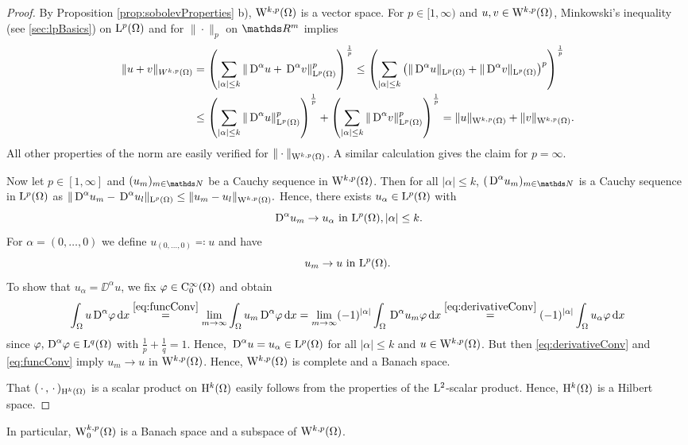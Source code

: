 \begin{proof}
  By Proposition \ref{prop:sobolevProperties} b), $\mathrm{W}^{k,p}(\Omega)$ is a vector space.
  For $p \in [1,\infty)$ and $u,v \in \mathrm{W}^{k,p}(\Omega)$, Minkowski's inequality (see \ref{sec:lpBasics}) on $\mathrm{L}^p(\Omega)$ and for $\|\cdot\|_p$ on $\R^m$ implies
    \begin{align*}
      \|u + v\|_{W^{k,p}(\Omega)}
      &= \left( \sum_{|\alpha| \leq k} \|\,{\operatorname{D}}^\alpha u + \,{\operatorname{D}}^\alpha v\|^p_{\mathrm{L}^p(\Omega)} \right)^{\frac{1}{p}} 
      \leq \left( \sum_{|\alpha|\leq k} \left( \|\,{\operatorname{D}}^\alpha u\|_{\mathrm{L}^p(\Omega)} + \|\,{\operatorname{D}}^\alpha v\|_{\mathrm{L}^p(\Omega)} \right)^p \right)^{\frac{1}{p}} \\
      &\leq \left( \sum_{|\alpha| \leq k} \|\,{\operatorname{D}}^\alpha u\|_{\mathrm{L}^p(\Omega)}^p\right)^{\frac{1}{p}}
      + \left( \sum_{|\alpha| \leq k} \|\,{\operatorname{D}}^\alpha v\|_{\mathrm{L}^p(\Omega)}^p\right)^{\frac{1}{p}}
      = \|u\|_{\mathrm{W}^{k,p}(\Omega)} + \|v\|_{\mathrm{W}^{k,p}(\Omega)}.
    \end{align*}
    All other properties of the norm are easily verified for $\|\cdot\|_{\mathrm{W}^{k,p}(\Omega)}$.
    A similar calculation gives the claim for $p = \infty$.

    Now let $p \in [1,\infty]$ and  $(u_m)_{m \in \N}$ be a Cauchy sequence in $\mathrm{W}^{k,p}(\Omega)$.
    Then for all $|\alpha|\leq k$, $(\DD^\alpha u_m)_{m \in \N}$ is a Cauchy sequence in $\mathrm{L}^p(\Omega)$ as 
    $
    \|\,{\operatorname{D}}^\alpha u_m - \,{\operatorname{D}}^\alpha u_l \|_{\mathrm{L}^p(\Omega)} \leq \|u_m - u_l \|_{\mathrm{W}^{k,p}(\Omega)}.
    $
    Hence, there exists $u_\alpha \in \mathrm{L}^p(\Omega)$ with
    \begin{equation}
      \label{eq:derivativeConv}
      \,{\operatorname{D}}^\alpha u_m \to u_\alpha \text{ in } \mathrm{L}^p(\Omega), |\alpha| \leq k.
    \end{equation}
    For $\alpha = (0,\dots,0)$ we define $u_{(0,\dots,0)}  \eqqcolon u$ and have
    \begin{equation}
      \label{eq:funcConv}
      u_m \to u \text{ in } \mathrm{L}^p(\Omega).
    \end{equation}
    To show that $u_\alpha = \DD^\alpha u$, we fix $\varphi \in \mathrm{C}_0^\infty(\Omega)$ and obtain
    \begin{align*}
      \int_\Omega u \,{\operatorname{D}}^\alpha \varphi \, {\operatorname{d}\!{x}}
      \overset{\eqref{eq:funcConv}}{=} \lim_{m \to \infty} \int_\Omega u_m \,{\operatorname{D}}^\alpha \varphi \, {\operatorname{d}\!{x}} 
      = \lim_{m \to \infty} (-1)^{|\alpha|} \int_\Omega \,{\operatorname{D}}^\alpha u_m \varphi \, {\operatorname{d}\!{x}} 
      \overset{\eqref{eq:derivativeConv}}{=} (-1)^{|\alpha|} \int_\Omega u_\alpha \varphi \, {\operatorname{d}\!{x}}
    \end{align*}
    since $\varphi, \,{\operatorname{D}}^\alpha \varphi \in \mathrm{L}^q(\Omega)$ with $\frac{1}{p} + \frac{1}{q} = 1$. Hence, $\,{\operatorname{D}}^\alpha u = u_\alpha \in \mathrm{L}^p(\Omega)$ for all $|\alpha| \leq k$ and $u \in \mathrm{W}^{k,p}(\Omega)$.
    But then \eqref{eq:derivativeConv} and \eqref{eq:funcConv} imply $u_m \to u$ in $\mathrm{W}^{k,p}(\Omega)$.
    Hence, $\mathrm{W}^{k,p}(\Omega)$ is complete and a Banach space.

    That $(\,\cdot\,,\,\cdot\,)_{\mathrm{H}^k(\Omega)}$ is a scalar product on $\mathrm{H}^k(\Omega)$ easily follows from the properties of the $\mathrm{L}^2$-scalar product.
    Hence, $\mathrm{H}^k(\Omega)$ is a Hilbert space.
\end{proof}

In particular, $\mathrm{W}_0^{k,p}(\Omega)$ is a Banach space and a subspace of $\mathrm{W}^{k,p}(\Omega)$.
